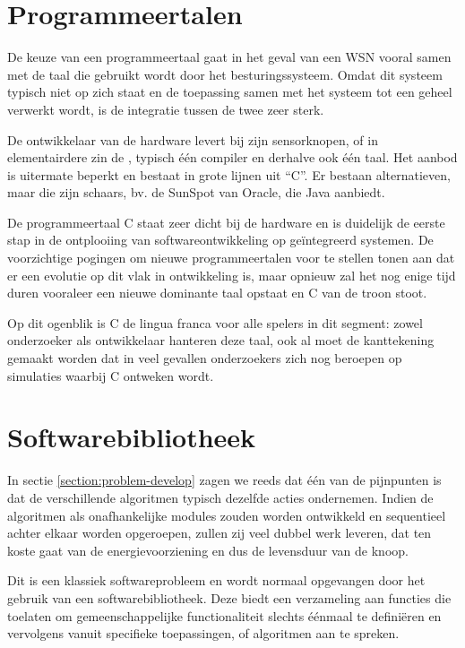 \vspace{-3mm}

\section{Programmeertalen}
\label{section:solution-proglang}

De keuze van een programmeertaal gaat in het geval van een WSN vooral samen met
de taal die gebruikt wordt door het besturingssysteem. Omdat dit systeem
typisch niet op zich staat en de toepassing samen met het systeem tot een
geheel verwerkt wordt, is de integratie tussen de twee zeer sterk.

De ontwikkelaar van de hardware levert bij zijn sensorknopen, of in
elementairdere zin de \mcu, typisch \'e\'en compiler en derhalve ook \'e\'en
taal. Het aanbod is uitermate beperkt en bestaat in grote lijnen uit ``C''. Er
bestaan alternatieven, maar die zijn schaars, bv. de SunSpot van Oracle, die
Java aanbiedt.

De programmeertaal C staat zeer dicht bij de hardware en is duidelijk de eerste
stap in de ontplooiing van softwareontwikkeling op ge\"integreerd systemen. De
voorzichtige pogingen om nieuwe programmeertalen voor te stellen tonen aan dat
er een evolutie op dit vlak in ontwikkeling is, maar opnieuw zal het nog enige
tijd duren vooraleer een nieuwe dominante taal opstaat en C van de troon stoot.

Op dit ogenblik is C de lingua franca voor alle spelers in dit segment: zowel
onderzoeker als ontwikkelaar hanteren deze taal, ook al moet de kanttekening
gemaakt worden dat in veel gevallen onderzoekers zich nog beroepen op
simulaties waarbij C ontweken wordt.

\vspace{-3mm}

\section{Softwarebibliotheek}
\label{section:solution-library}

In sectie \ref{section:problem-develop} zagen we reeds dat \'e\'en van de
pijnpunten is dat de verschillende algoritmen typisch dezelfde acties
ondernemen. Indien de algoritmen als onafhankelijke modules zouden worden
ontwikkeld en sequentieel achter elkaar worden opgeroepen, zullen zij veel
dubbel werk leveren, dat ten koste gaat van de energievoorziening en dus de
levensduur van de knoop.

Dit is een klassiek softwareprobleem en wordt normaal opgevangen door het
gebruik van een softwarebibliotheek. Deze biedt een verzameling aan functies
die toelaten om gemeenschappelijke functionaliteit slechts \'e\'enmaal te
defini\"eren en vervolgens vanuit specifieke toepassingen, of algoritmen aan te
spreken.

